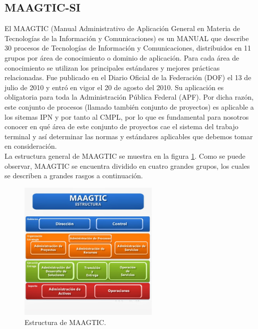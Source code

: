 	\subsection{MAAGTIC-SI}%
	El MAAGTIC (Manual Administrativo de Aplicación General en Materia de Tecnologías de la Información y Comunicaciones) es un MANUAL que describe 30 procesos de Tecnologías de Información y Comunicaciones, distribuidos en 11 grupos por área de conocimiento o dominio de aplicación. Para cada área de conocimiento se utilizan los principales estándares y mejores prácticas relacionadas\cite{MAAGTICSI}. Fue publicado en el Diario Oficial de la Federación (DOF) el 13 de julio de 2010 y entró en vigor el 20 de agosto del 2010. Su aplicación es obligatoria para toda la Administración Pública Federal (APF). Por dicha razón, este conjunto de procesos (llamado también conjunto de proyectos) es aplicable a los sitemas IPN y por tanto al CMPL, por lo que es fundamental para nosotros conocer en qué área de este conjunto de proyectos cae el sistema del trabajo terminal y así determinar las normas y estándares aplicables que debemos tomar en consideración.\\
	
	La estructura general de MAAGTIC se muestra en la figura \ref{fig:MAAGTIC}. Como se puede observar, MAAGTIC se encuentra dividido en cuatro grandes grupos, los cuales se describen a grandes rasgos a continuación.\\
	
	\begin{figure}[htbp!]
		\centering
			\includegraphics[width=0.6\textwidth]{images/antecedentes/MAAGTICSI.jpg}
		\caption{Estructura de MAAGTIC\cite{MAAGTICSIEstructura}.}
		\label{fig:MAAGTIC}
	\end{figure}
	
